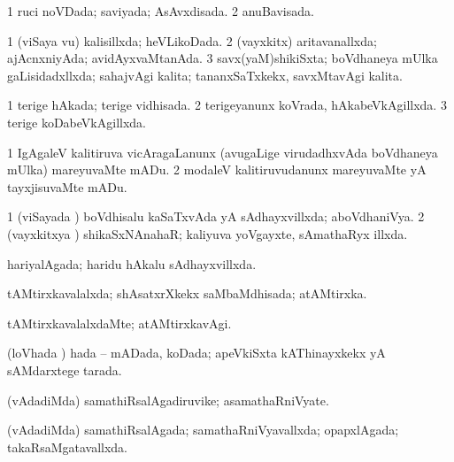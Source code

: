 {{\bentry
{} 
\gl{\gu}
\expl{}
\bmng
\bnum
\num{1} ruci noVDada; saviyada; AsAvxdisada. 
\num{2} anuBavisada. 
\enum
\emng
\eentry

\bentry
{} 
\gl{\gu}
\expl{}
\bmng
\bnum
\num{1} (viSaya \mo vu) kalisillxda; heVLikoDada. 
\num{2} (vayxkitx) aritavanallxda; ajAcnxniyAda; avidAyxvaMtanAda. 
\num{3} savx(yaM)shikiSxta; boVdhaneya mUlka gaLisidadxllxda; sahajvAgi kalita; tananxSaTxkekx, savxMtavAgi kalita. 
\enum
\emng
\eentry

\bentry
{} 
\gl{\gu}
\expl{}
\bmng
\bnum
\num{1} terige hAkada; terige vidhisada. 
\num{2} terigeyanunx koVrada, hAkabeVkAgillxda. 
\num{3} terige koDabeVkAgillxda. 
\enum
\emng
\eentry

\bentry
{} 
\gl{\sakirx}
\bmng
\bnum
\num{1} IgAgaleV kalitiruva vicAragaLanunx (avugaLige virudadhxvAda boVdhaneya mUlka) mareyuvaMte mADu. 
\num{2} modaleV kalitiruvudanunx mareyuvaMte yA tayxjisuvaMte mADu. 
\enum
\emng
\eentry

\bentry
{} 
\gl{\gu}
\expl{}
\bmng
\bnum
\num{1} (viSayada \vi) boVdhisalu kaSaTxvAda yA sAdhayxvillxda; aboVdhaniVya. 
\num{2} (vayxkitxya \vi) shikaSxNAnahaR; kaliyuva yoVgayxte, sAmathaRyx illxda. 
\enum
\emng
\eentry

\bentry
{} 
\gl{\gu}
\expl{}
\bmng
hariyalAgada; haridu hAkalu sAdhayxvillxda. 
\emng
\eentry

\bentry
{} 
\gl{\gu}
\expl{}
\bmng
tAMtirxkavalalxda; shAsatxrXkekx saMbaMdhisada; atAMtirxka. 
\emng
\eentry

\bentry
{} 
\gl{\kirxvi}
\expl{}
\bmng
tAMtirxkavalalxdaMte; atAMtirxkavAgi. 
\emng
\eentry

\bentry
{} 
\gl{\gu}
\expl{}
\bmng
(loVhada \vi) hada -- mADada, koDada; apeVkiSxta kAThinayxkekx yA sAMdarxtege tarada. 
\emng
\eentry

\bentry
{} 
\gl{\nA}
\expl{}
\bmng
(vAdadiMda) samathiRsalAgadiruvike; asamathaRniVyate. 
\emng
\eentry

\bentry
{} 
\gl{\gu}
\expl{}
\bmng
(vAdadiMda) samathiRsalAgada; samathaRniVyavallxda; opapxlAgada; takaRsaMgatavallxda. 
\emng
\eentry

}}
